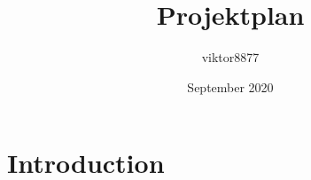 \documentclass{article}
\title{Projektplan}
\author{viktor8877 }
\date{September 2020}
\begin{document}
\maketitle

\section{Introduction}
\end{document}
